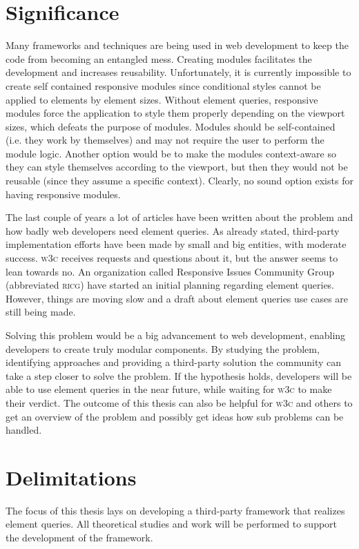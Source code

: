 \documentclass[a4paper,11pt]{kth-mag}
\begin{document}
    \section{Significance}
      Many frameworks and techniques are being used in web development to keep the code from becoming an entangled mess.
      Creating modules facilitates the development and increases reusability.
      Unfortunately, it is currently impossible to create self contained responsive modules since conditional styles cannot be applied to elements by element sizes.
      Without element queries, responsive modules force the application to style them properly depending on the viewport sizes, which defeats the purpose of modules.
      Modules should be self-contained (i.e. they work by themselves) and may not require the user to perform the module logic.
      Another option would be to make the modules context-aware so they can style themselves according to the viewport, but then they would not be reusable (since they assume a specific context).
      Clearly, no sound option exists for having responsive modules.

      The last couple of years a lot of articles have been written about the problem and how badly web developers need element queries.
      As already stated, third-party implementation efforts have been made by small and big entities, with moderate success.
      \textsc{w3c} receives requests and questions about it, but the answer seems to lean towards no. 
      An organization called Responsive Issues Community Group (abbreviated \textsc{ricg}) have started an initial planning regarding element queries.
      However, things are moving slow and a draft about element queries use cases are still being made.

      Solving this problem would be a big advancement to web development, enabling developers to create truly modular components.
      By studying the problem, identifying approaches and providing a third-party solution the community can take a step closer to solve the problem.
      If the hypothesis holds, developers will be able to use element queries in the near future, while waiting for \textsc{w3c} to make their verdict.
      The outcome of this thesis can also be helpful for \textsc{w3c} and others to get an overview of the problem and possibly get ideas how sub problems can be handled.
    \section{Delimitations}
      The focus of this thesis lays on developing a third-party framework that realizes element queries.
      All theoretical studies and work will be performed to support the development of the framework.
\end{document}
